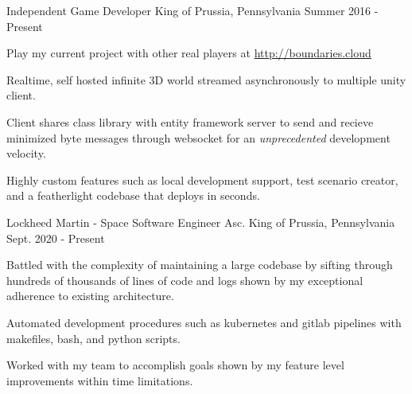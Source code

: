 

\begin{cventries}


  \cventry
    {Independent} %
    {Game Developer} %
    {King of Prussia, Pennsylvania} %
    {Summer 2016 - Present} %
    {
      \begin{cvitems} %
        \item {Play my current project with other real players at \url{http://boundaries.cloud}}
        \item {Realtime, self hosted infinite 3D world streamed asynchronously to multiple unity client.}
        \item {Client shares class library with entity framework server to send and recieve minimized byte messages through websocket for an \emph{unprecedented} development velocity.}
        \item {Highly custom features such as local development support, test scenario creator, and a featherlight codebase that deploys in seconds.}
      \end{cvitems}
    }

  \cventry
    {Lockheed Martin - Space} %
    {Software Engineer Asc.} %
    {King of Prussia, Pennsylvania} %
    {Sept. 2020 - Present} %
    {
      \begin{cvitems} %
        \item {Battled with the complexity of maintaining a large codebase by sifting through hundreds of thousands of lines of code and logs shown by my exceptional adherence to existing architecture.}
        \item {Automated development procedures such as kubernetes and gitlab pipelines with makefiles, bash, and python scripts.}
        \item {Worked with my team to accomplish goals shown by my feature level improvements within time limitations.}
      \end{cvitems}
    }


\end{cventries}
